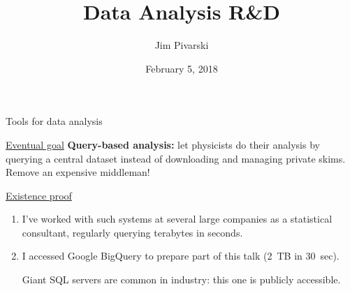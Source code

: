 \documentclass[aspectratio=169]{beamer}
\title[2018-02-05-cmsoffline-oamap]{Data Analysis R\&D}
\author{Jim Pivarski}
\institute{Princeton University -- DIANA-HEP}
\date{February 5, 2018}
\begin{document}

\begin{frame}
  \titlepage
\end{frame}




\begin{frame}{Tools for data analysis}
\vspace{0.5 cm}
\begin{block}{\underline{Eventual goal}}
\vspace{0.15 cm}
{\bf Query-based analysis:} let physicists do their analysis by querying a central dataset instead of downloading and managing private skims. Remove an expensive middleman!
\end{block}

\vspace{0.5 cm}
\begin{block}{\underline{Existence proof}}
\begin{enumerate}
\item I've worked with such systems at several large companies as a statistical consultant, regularly querying terabytes in seconds.
\item I accessed Google BigQuery to prepare part of this talk (2~TB in 30~sec).

Giant SQL servers are common in industry: this one is publicly accessible.
\end{enumerate}
\end{block}
\end{frame}
\end{document}
